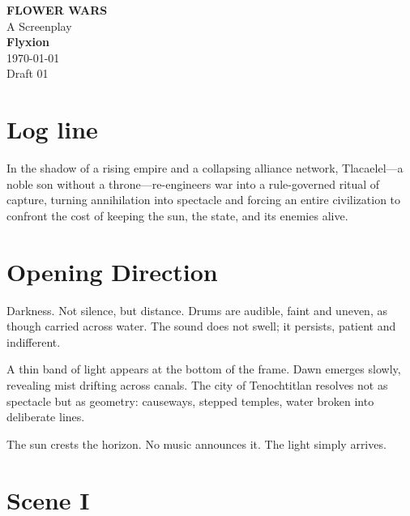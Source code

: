 \documentclass[12pt]{article}
\begin{document}
\begin{titlepage}
\begin{center}

\vspace*{2cm}

{\LARGE \textbf{FLOWER WARS}}\\[1.2cm]

{\large A Screenplay}\\[2.5cm]

{\normalsize
\textbf{Flyxion}\\
\vspace{0.6cm}
\today\\
\vspace{0.6cm}
Draft 01
}

\vfill

\end{center}
\end{titlepage}

\section*{Log line}

In the shadow of a rising empire and a collapsing alliance network, Tlacaelel---a noble son without a throne---re-engineers war into a rule-governed ritual of capture, turning annihilation into spectacle and forcing an entire civilization to confront the cost of keeping the sun, the state, and its enemies alive.

\section*{Opening Direction}

Darkness. Not silence, but distance. Drums are audible, faint and uneven, as though carried across water. The sound does not swell; it persists, patient and indifferent.

A thin band of light appears at the bottom of the frame. Dawn emerges slowly, revealing mist drifting across canals. The city of Tenochtitlan resolves not as spectacle but as geometry: causeways, stepped temples, water broken into deliberate lines.

The sun crests the horizon. No music announces it. The light simply arrives.

\section*{Scene I}
\end{document}
